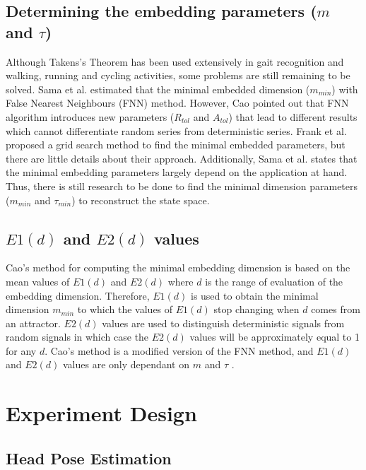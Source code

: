 \subsection{Determining the embedding parameters ($m$ and $\tau$)}
Although Takens's Theorem has been used extensively in gait
recognition and walking, running and cycling activities,
some problems are still remaining to be solved.
Sama et al. \cite{Sama2013} estimated that the minimal embedded
dimension ($m_{min}$) with False Nearest Neighbours (FNN) method.
However, Cao \cite{Cao1997} pointed out that FNN algorithm
introduces new parameters ($R_{tol}$ and $A_{tol}$) that lead
to different results which cannot differentiate random series from
deterministic series.
Frank et al. \cite{Frank2010} proposed a grid search method to find the minimal
embedded parameters, but there are little details about their approach.
Additionally, Sama et al. \cite{Sama2013} states that the minimal embedding
parameters largely depend on the
application at hand. Thus, there is still research to be done to find the
minimal dimension parameters ($m_{min}$ and $\tau_{min}$)
to reconstruct the state space.

\subsection{$E1(d)$ and $E2(d)$ values}
Cao's method for computing the minimal embedding dimension is based on the
mean values of $E1(d)$ and $E2(d)$ where $d$ is the range of evaluation of the
embedding dimension. Therefore, $E1(d)$ is used to obtain the minimal
dimension $m_{min}$ to which the values of $E1(d)$ stop changing when
 $d$ comes from an attractor. $E2(d)$ values are used to distinguish
 deterministic signals from random signals in which case the $E2(d)$
 values will be approximately equal to 1 for any $d$.
Cao's method is a modified version of the FNN method, and $E1(d)$ and $E2(d)$
values are only dependant on $m$ and $\tau$ \cite{Cao1997}.



\section{Experiment Design}

\subsection{Head Pose Estimation}

